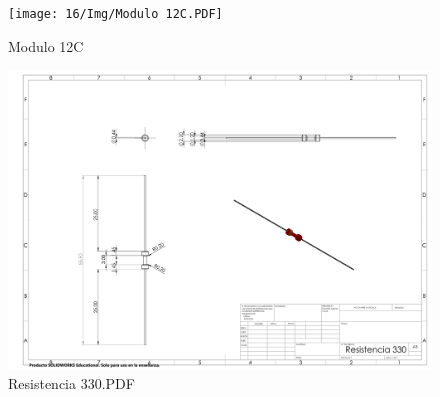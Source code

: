     \begin{figure}[H]
        \centering
        \texttt{[image: 16/Img/Modulo 12C.PDF]}
        \caption{Modulo 12C}
        \label{fig:Modulo 12C}
    \end{figure}
    \begin{figure}[H]
        \centering
        \includegraphics[trim = {10mm 10mm 10mm 10mm},clip,scale=0.150]{16/Img/Resistencia 330.PDF}
        \caption{Resistencia 330.PDF}
        \label{fig:Resistencia 330.PDF}
    \end{figure}
